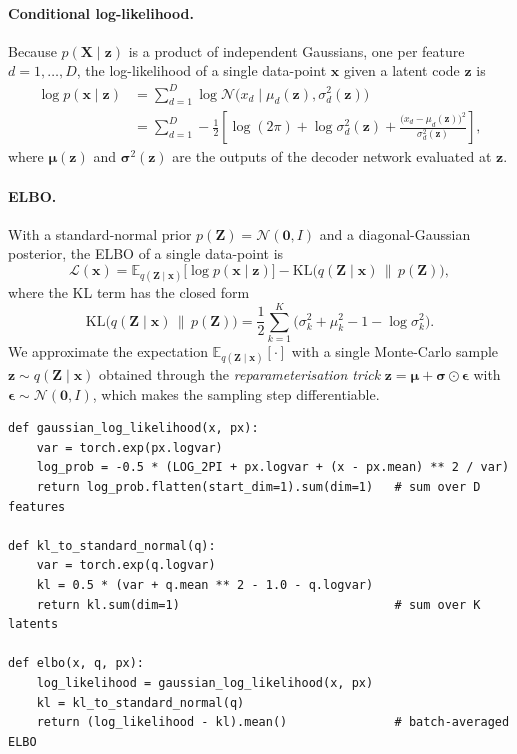 \documentclass{article}
\newcommand{\bx}{\mathbf{x}}
\newcommand{\bX}{\mathbf{X}}
\newcommand{\bz}{\mathbf{z}}
\newcommand{\bZ}{\mathbf{Z}}
\newcommand{\bmu}{\bm{\mu}}
\newcommand{\bsigma}{\bm{\sigma}}
\newcommand{\KL}{\mathrm{KL}}
\begin{document}
\paragraph{Conditional log-likelihood.} Because $p(\bX \mid \bz)$ is a product
of independent Gaussians, one per feature $d = 1,\dots,D$, the log-likelihood of
a single data-point $\bx$ given a latent code $\bz$ is
\begin{align}
\log p(\bx \mid \bz)
&= \sum_{d=1}^{D} \log \mathcal{N}\!\big(x_d \mid \mu_d(\bz), \sigma_d^2(\bz)\big) \nonumber \\
&= \sum_{d=1}^{D} -\frac{1}{2}\left[
        \log(2\pi) + \log \sigma_d^2(\bz)
        + \frac{\big(x_d - \mu_d(\bz)\big)^2}{\sigma_d^2(\bz)}
   \right],
\end{align}
where $\bmu(\bz)$ and $\bsigma^2(\bz)$ are the outputs of the decoder network
evaluated at $\bz$.

\paragraph{ELBO.} With a standard-normal prior $p(\bZ) = \mathcal{N}(\bm{0}, I)$
and a diagonal-Gaussian posterior, the ELBO of a single data-point is
\begin{equation}
\mathcal{L}(\bx)
= \mathbb{E}_{q(\bZ \mid \bx)}\!\big[\log p(\bx \mid \bz)\big]
  - \KL\!\big(q(\bZ \mid \bx)\,\|\,p(\bZ)\big),
\end{equation}
where the KL term has the closed form
\begin{equation}
\KL\!\big(q(\bZ \mid \bx)\,\|\,p(\bZ)\big)
= \frac{1}{2}\sum_{k=1}^{K}\Big(\sigma_k^2 + \mu_k^2 - 1 - \log \sigma_k^2\Big).
\end{equation}
We approximate the expectation $\mathbb{E}_{q(\bZ \mid \bx)}[\cdot]$ with a
single Monte-Carlo sample $\bz \sim q(\bZ \mid \bx)$ obtained through the
\emph{reparameterisation trick} $\bz = \bmu + \bsigma \odot \bm{\epsilon}$ with
$\bm{\epsilon} \sim \mathcal{N}(\bm{0}, I)$, which makes the sampling step
differentiable.

\begin{lstlisting}[caption={The ELBO terms (\texttt{vae/elbo.py}).}]
def gaussian_log_likelihood(x, px):
    var = torch.exp(px.logvar)
    log_prob = -0.5 * (LOG_2PI + px.logvar + (x - px.mean) ** 2 / var)
    return log_prob.flatten(start_dim=1).sum(dim=1)   # sum over D features

def kl_to_standard_normal(q):
    var = torch.exp(q.logvar)
    kl = 0.5 * (var + q.mean ** 2 - 1.0 - q.logvar)
    return kl.sum(dim=1)                              # sum over K latents

def elbo(x, q, px):
    log_likelihood = gaussian_log_likelihood(x, px)
    kl = kl_to_standard_normal(q)
    return (log_likelihood - kl).mean()               # batch-averaged ELBO
\end{lstlisting}
\end{document}
